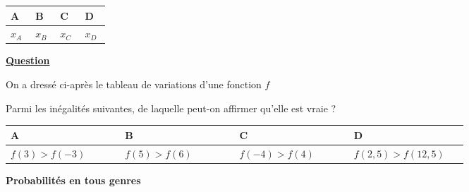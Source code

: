 \documentclass[oneside,12pt]{article}
\begin{document}
\begin{center}
	\renewcommand{\arraystretch}{1.35}
	\begin{tabular}{| P{0.22\linewidth} | P{0.22\linewidth} | P{0.22\linewidth} | P{0.22\linewidth} |} \hline
	A & B & C & D \\ \hline
	$x_A$ & $x_B$ & $x_C$ & $x_D$ \\\hline
	\end{tabular}
\end{center}



\underline{\textbf{Question }}

On a dressé ci-après le tableau de variations d'une fonction $f$

\begin{center}
\end{center}

Parmi les inégalités suivantes, de laquelle peut-on affirmer qu'elle est vraie ?

\begin{center}
	\renewcommand{\arraystretch}{1.35}
	\begin{tabular}{| P{0.22\linewidth} | P{0.22\linewidth} | P{0.22\linewidth} | P{0.22\linewidth} |} \hline
	A & B & C & D \\ \hline
	$f(3)>f(-3)$ & $f(5)>f(6)$ & $f(-4)>f(4)$ & $f(2,5)>f(12,5)$ \\ \hline
	\end{tabular}
\end{center}



\newpage
\textbf{\huge{Probabilités en tous genres}}
\end{document}
